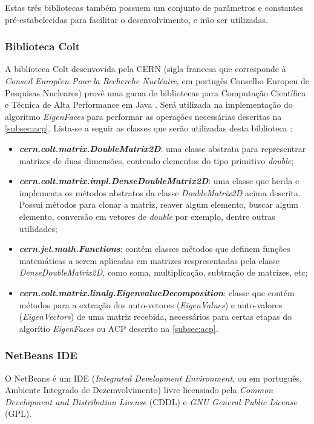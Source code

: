 Estas três bibliotecas também possuem um conjunto de parâmetros e constantes pré-estabelecidas para facilitar o desenvolvimento, e irão ser utilizadas.

\subsubsection{Biblioteca Colt}\label{subsec:bib_colt}
A biblioteca Colt desenvovida pela CERN (sigla francesa que corresponde à \textit{Conseil Européen Pour la Recherche Nucléaire}, em portugês Conselho Europeu de Pesquisas Nucleares) provê uma gama de bibliotecas para Computação Científica e Técnica de Alta Performance em Java \cite{colt}. Será utilizada na implementação do algoritmo \textit{EigenFaces} para performar as operações necessárias descritas na \autoref{subsec:acp}. Lista-se a seguir as classes que serão utilizadas desta biblioteca \cite{colt}:


\begin{itemize}
	\item \textbf{\textit{cern.colt.matrix.DoubleMatrix2D}}: uma classe abstrata para representrar matrizes de duas dimensões, contendo elementos do tipo primitivo \textit{double};
	
	\item \textbf{\textit{cern.colt.matrix.impl.DenseDoubleMatrix2D}}: uma classe que herda e implementa os métodos abstratos da classe \textit{DoubleMatrix2D} acima descrita. Possui métodos para clonar a matriz, reaver algum elemento, buscar algum elemento, conversão em vetores de \textit{double} por exemplo, dentre outras utilidades;
			
	\item \textbf{\textit{cern.jet.math.Functions}}:  contém classes métodos que definem funções matemáticas a serem aplicadas em matrizes respresentadas pela classe \textit{DenseDoubleMatrix2D}, como soma, multiplicação, subtração de matrizes, etc;
	
	\item \textbf{\textit{cern.colt.matrix.linalg.EigenvalueDecomposition}}: classe que contém métodos para a extração dos auto-vetores (\textit{EigenValues}) e auto-valores (\textit{EigenVectors}) de uma matriz recebida, necessários para certas etapas do algorítio \textit{EigenFaces} ou ACP descrito na \autoref{subsec:acp}.
\end{itemize}		

\subsubsection{NetBeans IDE}\label{subsec:netbeans}
O NetBeans é um IDE (\textit{Integrated Development Environment}, ou em português, Ambiente Integrado de Dezemvolvimento) livre licensiado pela \textit{Common Development and Distribution License} (CDDL) e \textit{GNU General Public License} (GPL).

